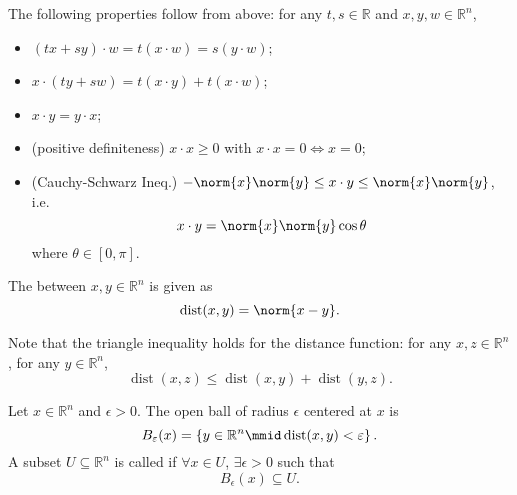 \documentclass[notoc,notitlepage]{tufte-book}
\DeclareMathOperator{\dist}{dist}
\begin{document}
The following properties follow  from above: for any $t, s \in \mathbb{R}$ and
$x, y , w\in \mathbb{R}^n$,
\begin{itemize}
  \item $(tx + sy) \cdot w = t ( x \cdot w ) = s(y \cdot w)$;
  \item $x \cdot (ty + sw) = t(x \cdot y) + t(x \cdot w)$;
  \item $x \cdot y = y \cdot x$;
  \item (positive definiteness) $x \cdot x \geq 0$ with $x \cdot x = 0 \iff x = 0$;
  \item (Cauchy-Schwarz Ineq.) $-\norm{x} \norm{y} \leq x \cdot y \leq \norm{x} \norm{y}$,
    i.e.
    \begin{equation*}
      x \cdot y = \norm{x} \norm{y} \cos \theta
    \end{equation*}
    where $\theta \in [0, \pi]$.
\end{itemize}

\begin{defn}[Distance]\label{defn:distance}
  The  between $x, y \in \mathbb{R}^n$ is given as
  \begin{equation*}
    \dist(x, y) = \norm{x - y}.
  \end{equation*}
\end{defn}

\begin{note}
  Note that the triangle inequality holds for the distance function: for any 
  $x, z \in \mathbb{R}^n$, for any $y \in \mathbb{R}^n$,
  \begin{equation*}
    \dist(x, z) \leq \dist(x, y) + \dist(y, z).
  \end{equation*}
\end{note}

\begin{defn}\label{defn:open_ball}
  Let $x \in \mathbb{R}^n$ and $\epsilon > 0$. The open ball of radius $\epsilon$ centered
  at $x$ is
  \begin{equation*}
    B_{\epsilon}(x) = \left\{ y \in \mathbb{R}^n \mmid \dist(x, y) < \epsilon \right\}.
  \end{equation*}
  A subset $U \subseteq \mathbb{R}^n$ is called  if $\forall x \in U$,
  $\exists \epsilon > 0$ such that
  \begin{equation*}
    B_{\epsilon}(x) \subseteq U.
  \end{equation*}
\end{defn}
\end{document}
